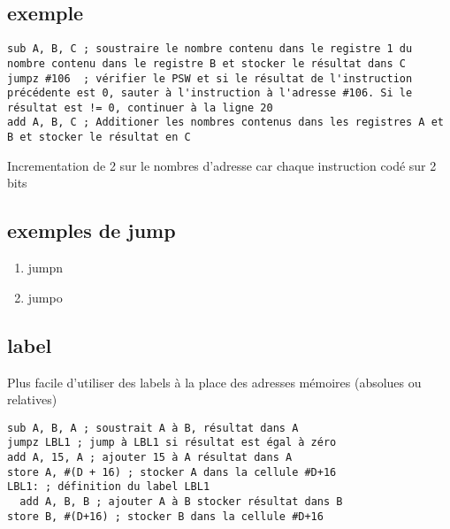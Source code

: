 \subsection{exemple}
\begin{lstlisting}
sub A, B, C ; soustraire le nombre contenu dans le registre 1 du nombre contenu dans le registre B et stocker le résultat dans C
jumpz #106  ; vérifier le PSW et si le résultat de l'instruction précédente est 0, sauter à l'instruction à l'adresse #106. Si le résultat est != 0, continuer à la ligne 20
add A, B, C ; Additioner les nombres contenus dans les registres A et B et stocker le résultat en C
\end{lstlisting}
Incrementation de 2 sur le nombres d'adresse car chaque instruction codé sur 2 bits

\subsection{exemples de jump}
\begin{enumerate}
\item jumpn
\item jumpo
\end{enumerate}

\subsection{label}
Plus facile d'utiliser des labels à la place des adresses mémoires (absolues ou relatives)
\begin{lstlisting}
sub A, B, A ; soustrait A à B, résultat dans A
jumpz LBL1 ; jump à LBL1 si résultat est égal à zéro
add A, 15, A ; ajouter 15 à A résultat dans A
store A, #(D + 16) ; stocker A dans la cellule #D+16
LBL1: ; définition du label LBL1
  add A, B, B ; ajouter A à B stocker résultat dans B
store B, #(D+16) ; stocker B dans la cellule #D+16
\end{lstlisting}

